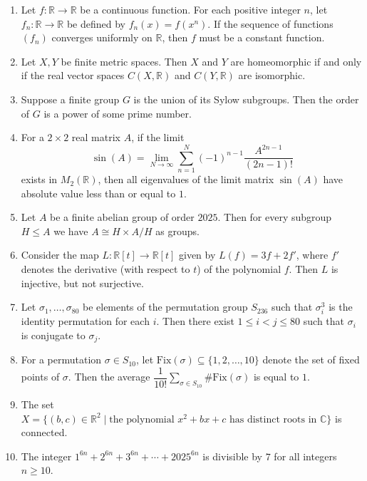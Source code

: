 \documentclass[11pt, a4paper]{article}
\begin{document}
\begin{enumerate}[resume]
\item Let $f:\mathbb{R}\to\mathbb{R}$ be a continuous function. For each positive integer $n$, let $f_n:\mathbb{R}\to\mathbb{R}$ be defined by $f_n(x)=f(x^n)$. If the sequence of functions $(f_n)$ converges uniformly on $\mathbb{R}$, then $f$ must be a constant function.

\item Let $X,Y$ be finite metric spaces. Then $X$ and $Y$ are homeomorphic if and only if the real vector spaces $C(X,\mathbb{R})$ and $C(Y,\mathbb{R})$ are isomorphic.

\item Suppose a finite group $G$ is the union of its Sylow subgroups. Then the order of $G$ is a power of some prime number.

\item For a $2\times2$ real matrix $A$, if the limit
\[ \sin(A)=\lim_{N\to\infty}\sum_{n=1}^N(-1)^{n-1}\frac{A^{2n-1}}{(2n-1)!} \]
exists in $M_2(\mathbb{R})$, then all eigenvalues of the limit matrix $\sin(A)$ have absolute value less than or equal to $1$.

\item Let $A$ be a finite abelian group of order $2025$. Then for every subgroup $H\le A$ we have $A\cong H\times A/H$ as groups.

\item Consider the map $L:\mathbb{R}[t]\to\mathbb{R}[t]$ given by $L(f)=3f+2f'$, where $f'$ denotes the derivative (with respect to $t$) of the polynomial $f$. Then $L$ is injective, but not surjective.

\item Let $\sigma_1,\ldots,\sigma_{80}$ be elements of the permutation group $S_{236}$ such that $\sigma_i^3$ is the identity permutation for each $i$. Then there exist $1\le i<j\le80$ such that $\sigma_i$ is conjugate to $\sigma_j$.

\item For a permutation $\sigma\in S_{10}$, let $\mathrm{Fix}(\sigma)\subseteq\{1,2,\ldots,10\}$ denote the set of fixed points of $\sigma$. Then the average $\dfrac1{10!}\displaystyle\sum_{\sigma\in S_{10}}\#\mathrm{Fix}(\sigma)$ is equal to $1$.

\item The set $X=\{(b,c)\in\mathbb{R}^2\mid\text{the polynomial }x^2+bx+c\text{ has distinct roots in }\mathbb{C}\}$ is connected.

\item The integer $1^{6n}+2^{6n}+3^{6n}+\cdots+2025^{6n}$ is divisible by $7$ for all integers $n\ge10$.
\end{enumerate}
\end{document}
